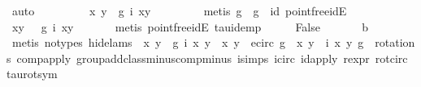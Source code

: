 \begin{isabellebody}
\ auto\isanewline
\ \ \isamarkupfalse%
\isanewline
\ \ \isamarkupfalse%
\ \isamarkupfalse%
\ {\isachardoublequoteopen}{\isasymtau}\ {\isacharparenleft}x{\isacharprime}{\isacharcomma}\ y{\isacharprime}{\isacharparenright}\ {\isacharequal}\ g\ {\isacharparenleft}i\ {\isacharparenleft}x{\isacharcomma}y{\isacharparenright}{\isacharparenright}{\isachardoublequoteclose}\ \ \ \isanewline
\ \ \ \ \isamarkupfalse%
\ {\isacharparenleft}metis\ {\isacartoucheopen}g\ {\isasymcirc}\ g{\isacharprime}\ {\isacharequal}\ id{\isacartoucheclose}\ pointfree{\isacharunderscore}idE{\isacharparenright}\isanewline
\ \ \isamarkupfalse%
\ \isamarkupfalse%
\ {\isachardoublequoteopen}{\isacharparenleft}x{\isacharprime}{\isacharcomma}y{\isacharprime}{\isacharparenright}\ {\isacharequal}\ {\isasymtau}\ {\isacharparenleft}g\ {\isacharparenleft}i\ {\isacharparenleft}x{\isacharcomma}y{\isacharparenright}{\isacharparenright}{\isacharparenright}{\isachardoublequoteclose}\ \isanewline
\ \ \ \ \isamarkupfalse%
\ {\isacharparenleft}metis\ pointfree{\isacharunderscore}idE\ tau{\isacharunderscore}idemp{\isacharparenright}\isanewline
\ \ \isamarkupfalse%
\ \isamarkupfalse%
\ {\isachardoublequoteopen}False{\isachardoublequoteclose}\ \isanewline
\ \ \ \ \isamarkupfalse%
\ b\isanewline
\ \ \ \ \isamarkupfalse%
\ {\isacharparenleft}metis\ {\isacharparenleft}no{\isacharunderscore}types{\isacharcomma}\ hide{\isacharunderscore}lams{\isacharparenright}\ {\isacartoucheopen}{\isasymtau}\ {\isacharparenleft}x{\isacharprime}{\isacharcomma}\ y{\isacharprime}{\isacharparenright}\ {\isacharequal}\ g\ {\isacharparenleft}i\ {\isacharparenleft}x{\isacharcomma}\ y{\isacharparenright}{\isacharparenright}{\isacartoucheclose}\ {\isacartoucheopen}{\isasymtau}\ {\isacharparenleft}x{\isacharprime}{\isacharcomma}\ y{\isacharprime}{\isacharparenright}\ {\isasymin}\ e{\isacharunderscore}circ{\isacartoucheclose}\ {\isacartoucheopen}g{\isacharprime}\ {\isacharparenleft}{\isasymtau}\ {\isacharparenleft}x{\isacharprime}{\isacharcomma}\ y{\isacharprime}{\isacharparenright}{\isacharparenright}\ {\isacharequal}\ i\ {\isacharparenleft}x{\isacharcomma}\ y{\isacharparenright}{\isacartoucheclose}\ {\isacartoucheopen}g{\isacharprime}\ {\isasymin}\ rotations{\isacartoucheclose}\ comp{\isacharunderscore}apply\ group{\isacharunderscore}add{\isacharunderscore}class{\isachardot}minus{\isacharunderscore}comp{\isacharunderscore}minus\ i{\isachardot}simps\ i{\isacharunderscore}circ\ id{\isacharunderscore}apply\ r{\isacharunderscore}expr{\isacharparenleft}{}{\isacharparenright}\ rot{\isacharunderscore}circ\ tau{\isacharunderscore}rot{\isacharunderscore}sym{\isacharparenright}\isanewline

\end{isabellebody}
